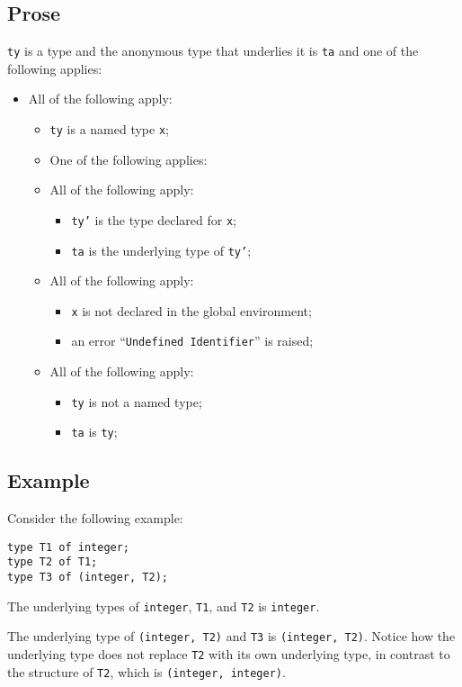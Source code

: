 \documentclass{book}
\begin{document}
\subsection{Prose}
\texttt{ty} is a type and the anonymous type that underlies it is \texttt{ta} and one of the following
applies:
\begin{itemize}
    \item All of the following apply:
      \begin{itemize}
        \item \texttt{ty} is a named type \texttt{x};
        \item One of the following applies:
        \item All of the following apply:
        \begin{itemize}
        \item \texttt{ty'} is the type declared for \texttt{x};
        \item \texttt{ta} is the underlying type of \texttt{ty'};
        \end{itemize}
        \item All of the following apply:
        \begin{itemize}
        \item \texttt{x} is not declared in the global environment;
        \item an error ``\texttt{Undefined Identifier}'' is raised;
        \end{itemize}
        \item All of the following apply:
        \begin{itemize}
        \item \texttt{ty} is not a named type;
        \item \texttt{ta} is \texttt{ty};
      \end{itemize}
    \end{itemize}
\end{itemize}

\subsection{Example}
Consider the following example:
\begin{verbatim}
type T1 of integer;
type T2 of T1;
type T3 of (integer, T2);
\end{verbatim}

The underlying types of \texttt{integer}, \texttt{T1}, and \texttt{T2} is \texttt{integer}.

The underlying type of \texttt{(integer, T2)} and \texttt{T3} is
\texttt{(integer, T2)}.  Notice how the underlying type does not replace
\texttt{T2} with its own underlying type, in contrast to the structure of
\texttt{T2}, which is \texttt{(integer, integer)}.
\end{document}
